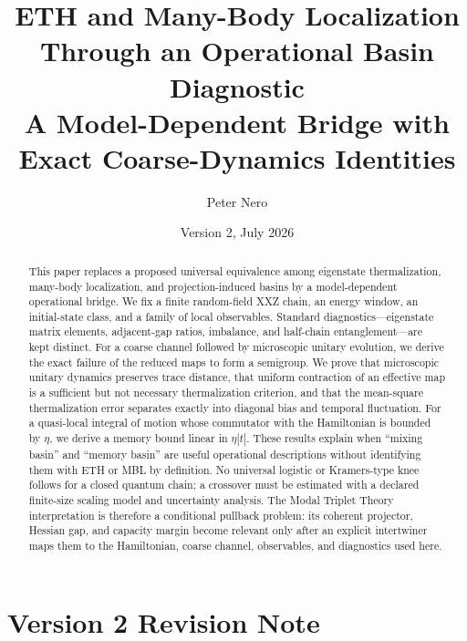 \documentclass[11pt]{article}
\title{\textbf{ETH and Many-Body Localization Through an Operational Basin Diagnostic}\\
\large A Model-Dependent Bridge with Exact Coarse-Dynamics Identities}
\author{Peter Nero}
\date{Version 2, July 2026}
\begin{document}
\maketitle

\begin{abstract}
This paper replaces a proposed universal equivalence among eigenstate
thermalization, many-body localization, and projection-induced basins by
a model-dependent operational bridge.  We fix a finite random-field XXZ
chain, an energy window, an initial-state class, and a family of local
observables.  Standard diagnostics---eigenstate matrix elements,
adjacent-gap ratios, imbalance, and half-chain entanglement---are kept
distinct.  For a coarse channel followed by microscopic unitary
evolution, we derive the exact failure of the reduced maps to form a
semigroup.  We prove that microscopic unitary dynamics preserves trace
distance, that uniform contraction of an effective map is a sufficient
but not necessary thermalization criterion, and that the mean-square
thermalization error separates exactly into diagonal bias and temporal
fluctuation.  For a quasi-local integral of motion whose commutator with
the Hamiltonian is bounded by $\eta$, we derive a memory bound linear in
$\eta |t|$.  These results explain when ``mixing basin'' and
``memory basin'' are useful operational descriptions without identifying
them with ETH or MBL by definition.  No universal logistic or
Kramers-type knee follows for a closed quantum chain; a crossover must be
estimated with a declared finite-size scaling model and uncertainty
analysis.  The Modal Triplet Theory interpretation is therefore a
conditional pullback problem: its coherent projector, Hessian gap, and
capacity margin become relevant only after an explicit intertwiner maps
them to the Hamiltonian, coarse channel, observables, and diagnostics
used here.
\end{abstract}

\section*{Version 2 Revision Note}
\end{document}
